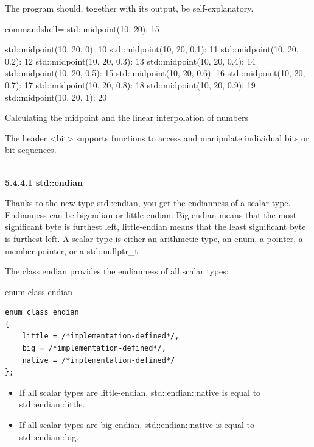 The program should, together with its output, be self-explanatory.

\begin{tcblisting}{commandshell={}}
std::midpoint(10, 20): 15

std::midpoint(10, 20, 0): 10
std::midpoint(10, 20, 0.1): 11
std::midpoint(10, 20, 0.2): 12
std::midpoint(10, 20, 0.3): 13
std::midpoint(10, 20, 0.4): 14
std::midpoint(10, 20, 0.5): 15
std::midpoint(10, 20, 0.6): 16
std::midpoint(10, 20, 0.7): 17
std::midpoint(10, 20, 0.8): 18
std::midpoint(10, 20, 0.9): 19
std::midpoint(10, 20, 1): 20
\end{tcblisting}

\begin{center}
Calculating the midpoint and the linear interpolation of numbers
\end{center}


The header <bit> supports functions to access and manipulate individual bits or bit sequences.

\hspace*{\fill} \\ %
\noindent
\textbf{5.4.4.1\hspace{0.2cm} std::endian}

Thanks to the new type std::endian, you get the endianness of a scalar type. Endianness can be bigendian or little-endian. Big-endian means that the most significant byte is furthest left, little-endian means that the least significant byte is furthest left. A scalar type is either an arithmetic type, an enum, a pointer, a member pointer, or a std::nullptr\_t.

The class endian provides the endianness of all scalar types:

\noindent
enum class endian
\begin{lstlisting}[style=styleCXX]
enum class endian
{
	little = /*implementation-defined*/,
	big = /*implementation-defined*/,
	native = /*implementation-defined*/
};
\end{lstlisting}

\begin{itemize}
\item 
If all scalar types are little-endian, std::endian::native is equal to std::endian::little.

\item 
If all scalar types are big-endian, std::endian::native is equal to std::endian::big.
\end{itemize}

